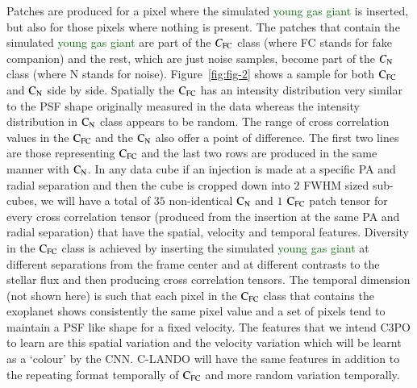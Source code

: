 \documentclass[referee]{aa} %
\newcommand{\newchange}[1]{\textcolor{darkgreen}{#1}}
\begin{document}
Patches are produced for a pixel where the simulated \newchange{young gas giant} is inserted, but also for those pixels where nothing is present.
The patches that contain the simulated \newchange{young gas giant} are part of the $C_{\rm{FC}}$ class (where FC stands for fake companion) and the rest, which are just noise samples, become part of the $C_{\rm{N}}$ class (where N stands for noise).
Figure~\ref{fig:fig-2} shows a sample for both $\rm{C_{FC}}$ and $\rm{C_N}$ side by side.
Spatially the $\rm{C_{FC}}$ has an intensity distribution very similar to the PSF shape originally measured in the data whereas the intensity distribution in $\rm{C_N}$ class appears to be random.
The range of cross correlation values in the $\rm{C_{FC}}$ and the $\rm{C_N}$ also offer a point of difference.
The first two lines are those representing $\rm{C_{FC}}$ and the last two rows are produced in the same manner with $\rm{C_N}$.
In any data cube if an injection is made at a specific PA and radial separation and then the cube is cropped down into $2$ FWHM sized sub-cubes, we will have a total of $35$ non-identical $\rm{C_N}$ and $1$ $\rm{C_{FC}}$ patch tensor for every cross correlation tensor (produced from the insertion at the same PA and radial separation) that have the spatial, velocity and temporal features. 
Diversity in the $\rm{C_{FC}}$ class is achieved by inserting the simulated \newchange{young gas giant} at different separations from the frame center and at different contrasts to the stellar flux and then producing cross correlation tensors.
The temporal dimension (not shown here) is such that each pixel in the $\rm{C_{FC}}$ class that contains the exoplanet shows consistently the same pixel value and a set of pixels tend to maintain a PSF like shape for a fixed velocity. 
The features that we intend C3PO to learn are this spatial variation and the velocity variation which will be learnt as a `colour' by the CNN. 
C-LANDO will have the same features in addition to the repeating format temporally of $\rm{C_{FC}}$ and more random variation temporally.
\end{document}
